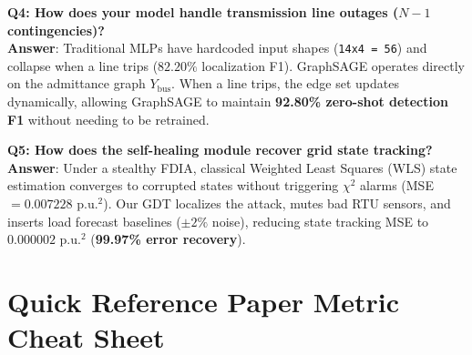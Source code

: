 \documentclass[11pt,a4paper]{article}
\begin{document}
\begin{mdframed}[style=qastyle]
\textbf{Q4: How does your model handle transmission line outages ($N-1$ contingencies)?}\\
\textbf{Answer}: Traditional MLPs have hardcoded input shapes (\texttt{14x4 = 56}) and collapse when a line trips ($82.20\%$ localization F1). GraphSAGE operates directly on the admittance graph $Y_{\text{bus}}$. When a line trips, the edge set updates dynamically, allowing GraphSAGE to maintain \textbf{92.80\% zero-shot detection F1} without needing to be retrained.
\end{mdframed}

\begin{mdframed}[style=qastyle]
\textbf{Q5: How does the self-healing module recover grid state tracking?}\\
\textbf{Answer}: Under a stealthy FDIA, classical Weighted Least Squares (WLS) state estimation converges to corrupted states without triggering $\chi^2$ alarms (MSE $= 0.007228\text{ p.u.}^2$). Our GDT localizes the attack, mutes bad RTU sensors, and inserts load forecast baselines ($\pm 2\%$ noise), reducing state tracking MSE to $0.000002\text{ p.u.}^2$ (\textbf{99.97\% error recovery}).
\end{mdframed}

\section{Quick Reference Paper Metric Cheat Sheet}

\begin{table}[htbp]
  \centering
\end{table}
\end{document}
